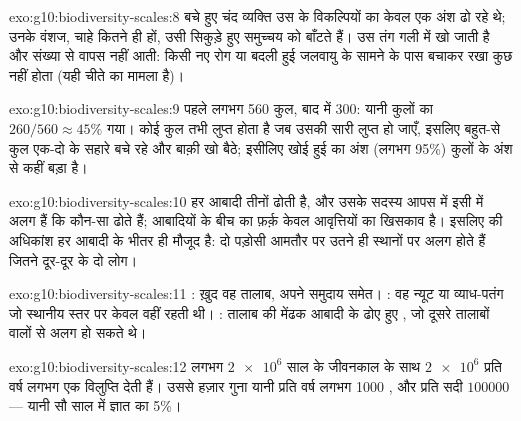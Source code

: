 \begin{solution}{exo:g10:biodiversity-scales:8}
बचे हुए चंद व्यक्ति उस  के विकल्पियों का केवल एक अंश ढो रहे थे;
उनके वंशज, चाहे कितने ही हों, उसी सिकुड़े हुए समुच्चय को बाँटते हैं।
 उस तंग गली में खो जाती है और संख्या से वापस नहीं आती:
किसी नए रोग या बदली हुई जलवायु के सामने  के पास बचाकर रखा कुछ
नहीं होता (यही चीते का मामला है)।
\end{solution}

\begin{solution}{exo:g10:biodiversity-scales:9}
पहले लगभग 560 कुल, बाद में 300: यानी कुलों का $260/560 \approx 45\%$
गया। कोई कुल तभी लुप्त होता है जब उसकी सारी  लुप्त हो जाएँ,
इसलिए बहुत-से कुल एक-दो  के सहारे बचे रहे और बाक़ी खो बैठे;
इसीलिए खोई हुई  का अंश (लगभग 95\%) कुलों के अंश से कहीं बड़ा
है।
\end{solution}

\begin{solution}{exo:g10:biodiversity-scales:10}
हर आबादी तीनों  ढोती है, और उसके सदस्य आपस में इसी में अलग हैं कि
कौन-सा ढोते हैं; आबादियों के बीच का फ़र्क़ केवल आवृत्तियों का खिसकाव है।
इसलिए  की अधिकांश  हर आबादी के भीतर ही मौजूद है:
दो पड़ोसी आमतौर पर उतने ही स्थानों पर अलग होते हैं जितने दूर-दूर के दो
लोग।
\end{solution}

\begin{solution}{exo:g10:biodiversity-scales:11}
: ख़ुद वह तालाब, अपने समुदाय समेत। : वह न्यूट या
व्याध-पतंग जो स्थानीय स्तर पर केवल वहीं रहती थी। : तालाब की मेंढक
आबादी के ढोए हुए , जो दूसरे तालाबों वालों से अलग हो सकते थे।
\end{solution}

\begin{solution}{exo:g10:biodiversity-scales:12}
लगभग $\num{2e6}$ साल के जीवनकाल के साथ $\num{2e6}$  प्रति वर्ष
लगभग एक विलुप्ति देती हैं। उससे हज़ार गुना यानी प्रति वर्ष लगभग 1000
, और प्रति सदी $\num{100000}$ --- यानी सौ साल में ज्ञात
 का 5\%।
\end{solution}

